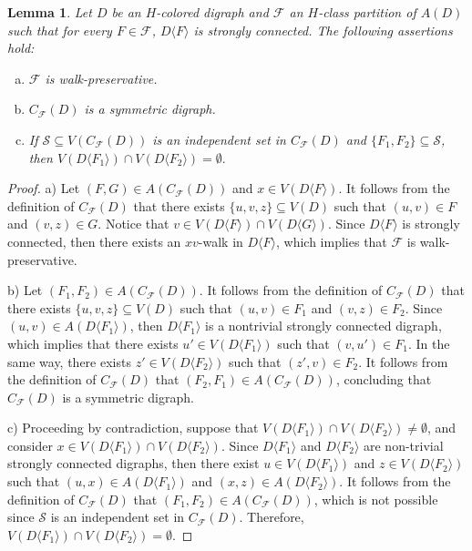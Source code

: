 \documentclass[10pt,a4paper]{article}
\newtheorem{lemma}[theorem]{Lemma}
\begin{document}
\begin{lemma}
\label{lemmastronglyconnected}
Let $D$ be an $H$-colored digraph and $\mathscr{F}$ an $H$-class partition of $A(D)$ such that for every $F \in \mathscr{F}$, $D\langle F \rangle$ is strongly connected. The following assertions hold:
\begin{enumerate}[a)]
\item $\mathscr{F}$ is walk-preservative.

\item $C_{\mathscr{F}}(D)$ is a symmetric digraph.

\item If $\mathcal{S} \subseteq V(C_{\mathscr{F}}(D) )$ is an independent set in $C_{\mathscr{F}}(D)$ and $\{F_{1}, F_{2} \} \subseteq \mathcal{S}$, then $V(D \langle F_{1} \rangle ) \cap V(D \langle F_{2} \rangle) = \emptyset.$
\end{enumerate}
\end{lemma}
\begin{proof}
a)  Let $(F, G) \in A(C_{\mathscr{F}}(D) )$ and $x \in V(D \langle F \rangle )$. It follows from the definition of $C_{\mathscr{F}}(D)$ that there exists $\{ u, v, z \} \subseteq V(D)$ such that $(u,v) \in F$ and $(v,z) \in G$. Notice that $v \in V(D\langle F \rangle ) \cap V(D \langle G \rangle )$. Since $D\langle F \rangle$ is strongly connected, then there exists an $xv$-walk in $D \langle F \rangle$, which implies that $\mathscr{F}$ is walk-preservative.

b) Let $(F_{1}, F_{2}) \in A(C_{\mathscr{F}}(D) )$. It follows from the definition of $C_{\mathscr{F}}(D)$ that there exists $\{u, v, z \}\subseteq V(D)$ such that $(u,v) \in F_{1}$ and $(v,z) \in F_{2}$. 
Since $(u,v) \in A(D\langle F_{1} \rangle )$, then  $D\langle F_{1} \rangle$ is a nontrivial strongly connected digraph, which implies that  there exists $u' \in V(D\langle F_{1} \rangle)$ such that $(v,u') \in F_{1}$. In the same way,  there exists $z' \in V(D \langle F_{2} \rangle )$ such that $(z',v) \in F_{2}$. It follows from the definition of $C_{\mathscr{F}}(D)$ that $(F_{2}, F_{1}) \in  A(C_{\mathscr{F}}(D) )$, concluding that $C_{\mathscr{F}}(D)$ is a symmetric digraph.
   
c) Proceeding by contradiction, suppose that  $V(D \langle F_{1} \rangle ) \cap V(D \langle F_{2} \rangle) \neq \emptyset$, and consider $x \in  V(D \langle F_{1} \rangle ) \cap V(D \langle F_{2} \rangle)$. 
Since $D \langle F_{1} \rangle$ and $D \langle F_{2} \rangle$ are non-trivial strongly connected digraphs, then there exist $u \in V( D \langle F_{1} \rangle )$ and $z \in V(D \langle F_{2} \rangle )$ such that $(u,x) \in A(D\langle F_{1} \rangle)$ and $(x,z) \in A(D \langle F_{2} \rangle )$. It follows from the definition of $C_{\mathscr{F}}(D)$ that $(F_{1}, F_{2}) \in A(C_{\mathscr{F}}(D) )$, which is not possible since $\mathcal{S}$ is an independent set in $C_{\mathscr{F}}(D)$. Therefore, $V(D \langle F_{1} \rangle ) \cap V(D \langle F_{2} \rangle) = \emptyset.$
\end{proof}
\end{document}
